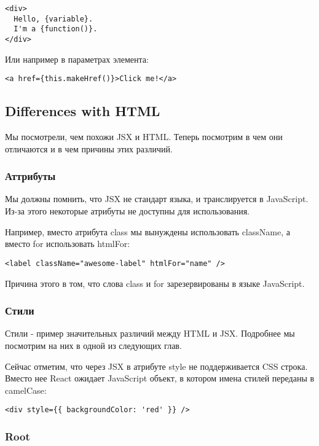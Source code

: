\begin{lstlisting}
<div>
  Hello, {variable}.
  I'm a {function()}.
</div>	
\end{lstlisting}


Или например в параметрах элемента:

\begin{lstlisting}
<a href={this.makeHref()}>Click me!</a>
\end{lstlisting}

\subsection*{Differences with HTML}

Мы посмотрели, чем похожи JSX и HTML. Теперь посмотрим в чем они отличаются и в чем причины этих различий.

\subsubsection*{Аттрибуты}

Мы должны помнить, что JSX не стандарт языка, и транслируется в JavaScript. Из-за этого некоторые атрибуты не доступны для использования.

Например, вместо атрибута class мы вынуждены использовать className, а вместо for использовать htmlFor:

\begin{lstlisting}
<label className="awesome-label" htmlFor="name" />
\end{lstlisting}

Причина этого в том, что слова class и for зарезервированы в языке JavaScript.

\subsubsection*{Стили}

Стили - пример значительных различий между HTML и JSX. Подробнее мы посмотрим на них в одной из следующих глав. 

Сейчас отметим, что через JSX в атрибуте style не поддерживается CSS строка. Вместо нее React ожидает JavaScript объект, в котором имена стилей переданы в camelCase:

\begin{lstlisting}
<div style={{ backgroundColor: 'red' }} />
\end{lstlisting}

\subsubsection*{Root}

